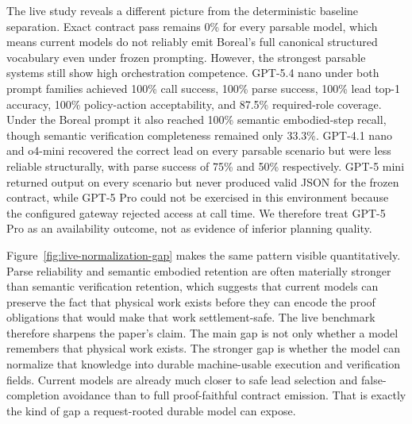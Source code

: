 The live study reveals a different picture from the deterministic baseline separation. Exact contract pass remains 0\% for every parsable model, which means current models do not reliably emit Boreal's full canonical structured vocabulary even under frozen prompting. However, the strongest parsable systems still show high orchestration competence. GPT-5.4 nano under both prompt families achieved 100\% call success, 100\% parse success, 100\% lead top-1 accuracy, 100\% policy-action acceptability, and 87.5\% required-role coverage. Under the Boreal prompt it also reached 100\% semantic embodied-step recall, though semantic verification completeness remained only 33.3\%. GPT-4.1 nano and o4-mini recovered the correct lead on every parsable scenario but were less reliable structurally, with parse success of 75\% and 50\% respectively. GPT-5 mini returned output on every scenario but never produced valid JSON for the frozen contract, while GPT-5 Pro could not be exercised in this environment because the configured gateway rejected access at call time. We therefore treat GPT-5 Pro as an availability outcome, not as evidence of inferior planning quality.

Figure~\ref{fig:live-normalization-gap} makes the same pattern visible quantitatively. Parse reliability and semantic embodied retention are often materially stronger than semantic verification retention, which suggests that current models can preserve the fact that physical work exists before they can encode the proof obligations that would make that work settlement-safe. The live benchmark therefore sharpens the paper's claim. The main gap is not only whether a model remembers that physical work exists. The stronger gap is whether the model can normalize that knowledge into durable machine-usable execution and verification fields. Current models are already much closer to safe lead selection and false-completion avoidance than to full proof-faithful contract emission. That is exactly the kind of gap a request-rooted durable model can expose.
